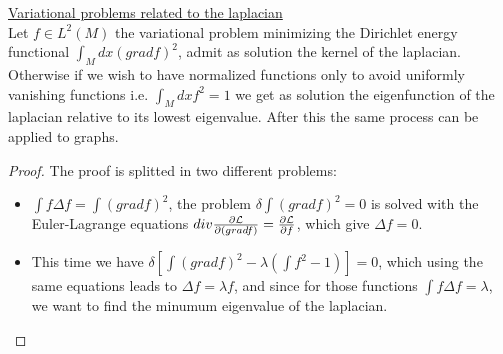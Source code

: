 \documentclass[../main.tex]{subfiles}
\begin{document}
\begin{prop}
    \underline{Variational problems related to the laplacian}\\
    Let $f \in L^2(M)$ the variational problem minimizing the Dirichlet energy functional $\int_M dx (gradf)^2$, 
    admit as solution the kernel of the laplacian. Otherwise if we wish to have normalized functions only
    to avoid uniformly vanishing functions i.e. $\int_M dx f^2 = 1$ we get as solution the eigenfunction of the laplacian
    relative to its lowest eigenvalue. After this the same process can be applied to graphs.
\end{prop}
\begin{proof} The proof is splitted in two different problems:
    \begin{itemize}
        \item 
	$\int f \Delta f = \int (gradf)^2$, the problem $\delta \int (gradf)^2 = 0$ is solved with the
	Euler-Lagrange equations $div \frac{\partial \mathcal{L}}{\partial (gradf)}=\frac{\partial \mathcal{L}}{\partial f}$, which give $\Delta f = 0$.
	\item
	This time we have $\delta[\int (gradf)^2 - \lambda (\int f^2 -1)]=0$, which using the same equations
	leads to $\Delta f = \lambda f$, and since for those functions $\int f \Delta f = \lambda$, we want to find
	the minumum eigenvalue of the laplacian.
    \end{itemize}
\end{proof}
\end{document}
